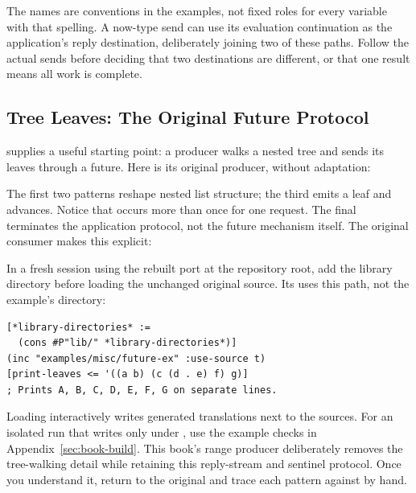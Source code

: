 The names are conventions in the examples, not fixed roles for every
variable with that spelling. A now-type send can use its evaluation
continuation as the application's reply destination, deliberately joining
two of these paths. Follow the actual sends before deciding that two
destinations are different, or that one result means all work is complete.

\subsection{Tree Leaves: The Original Future Protocol}
\label{sec:original-future}

 supplies a useful
starting point: a producer walks a nested tree and sends its leaves
through a future. Here is its original producer, without adaptation:


The first two patterns reshape nested list structure; the third emits a
leaf and advances. Notice that  occurs more than once for one
request. The final  terminates the application protocol,
not the future mechanism itself.
The original consumer makes this explicit:


In a fresh session using the rebuilt port at the repository root,
add the library directory before loading the unchanged original source.
Its  uses this path, not the example's directory:

\begin{codeblock}
\begin{lstlisting}
[*library-directories* :=
  (cons #P"lib/" *library-directories*)]
(inc "examples/misc/future-ex" :use-source t)
[print-leaves <= '((a b) (c (d . e) f) g)]
; Prints A, B, C, D, E, F, G on separate lines.
\end{lstlisting}
\end{codeblock}

Loading interactively writes generated translations next to the sources.
For an isolated run that writes only under , use the
example checks in Appendix~\ref{sec:book-build}.
This book's range producer deliberately removes the tree-walking
detail while retaining this reply-stream and sentinel protocol.
Once you understand it, return to the original and trace each pattern
against  by hand.

